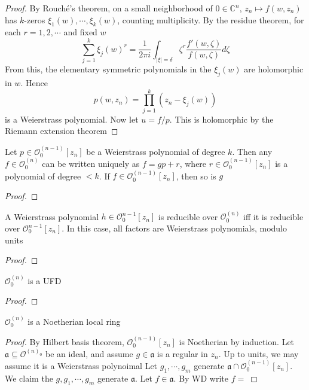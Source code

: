 \documentclass[../main.tex]{subfiles}
\begin{document}
\begin{proof}
By Rouch\'e's theorem, on a small neighborhood of $0\in\mathbb C^n$, $z_n\mapsto f(w,z_n)$ has $k$-zeros $\xi_1(w),\cdots,\xi_k(w)$, counting multiplicity. By the residue theorem, for each $r=1,2,\cdots$ and fixed $w$
\[\sum_{j=1}^k\xi_j(w)^r=\frac{1}{2\pi i}\int_{|\xi|=\delta}\zeta^r\frac{f'(w,\zeta)}{f(w,\zeta)}d\zeta\]
From this, the elementary symmetric polynomials in the $\xi_j(w)$ are holomorphic in $w$. Hence
\[p(w,z_n)=\prod_{j=1}^k(z_n-\xi_j(w))\]
is a Weierstrass polynomial. Now let $u=f/p$. This is holomorphic by the Riemann extension theorem
\end{proof}

\begin{theorem}
Let $p\in\mathcal O^{(n-1)}_0[z_n]$ be a Weierstrass polynomial of degree $k$. Then any $f\in\mathcal O^{(n)}_0$ can be written uniquely as $f=gp+r$, where $r\in\mathcal O^{(n-1)}_0[z_n]$ is a polynomial of degree $<k$. If $f\in \mathcal O^{(n-1)}_0[z_n]$, then so is $g$
\end{theorem}

\begin{proof}

\end{proof}

\begin{lemma}
A Weierstrass polynomial $h\in\mathcal O^{n-1}_0[z_n]$ is reducible over $\mathcal O^{(n)}_0$ iff it is reducible over $\mathcal O^{n-1}_0[z_n]$. In this case, all factors are Weierstrass polynomials, modulo units
\end{lemma}

\begin{proof}

\end{proof}

\begin{theorem}
$\mathcal O^{(n)}_0$ is a UFD
\end{theorem}

\begin{proof}

\end{proof}

\begin{theorem}[Oka]
$\mathcal O^{(n)}_0$ is a Noetherian local ring
\end{theorem}

\begin{proof}
By Hilbert basis theorem, $\mathcal O^{(n-1)}_0[z_n]$ is Noetherian by induction. Let $\mathfrak a\subseteq\mathcal O^{(n)_0}$ be an ideal, and assume $g\in\mathfrak a$ is a regular in $z_n$. Up to units, we may assume it is a Weierstrass polynoimal Let $g_1,\cdots,g_m$ generate $\mathfrak a\cap\mathcal O^{(n-1)}_0[z_n]$. We claim the $g,g_1,\cdots,g_m$ generate $\mathfrak a$. Let $f\in\mathfrak a$. By WD write $f=$
\end{proof}
\end{document}
